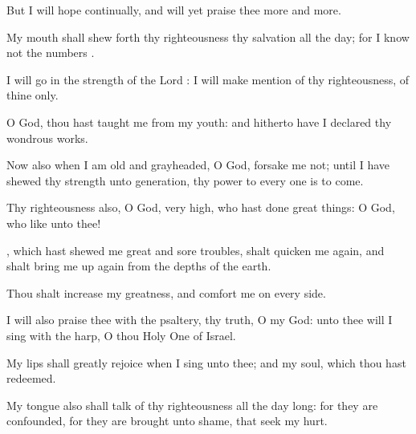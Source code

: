{\Q {}But I will
hope
continually, and will yet
praise thee
more and
more.


\par }{\Q {}My
mouth shall shew
forth thy
righteousness
{} thy
salvation all the
day; for I
know not the
numbers
{}.


\par }{\Q {}I will go
in the
strength of the
Lord
{}: I will make
mention of thy
righteousness,
{} of thine only.


\par }{\Q {}O
God, thou hast
taught me from my
youth: and hitherto have I
declared thy wondrous
works.


\par }{\Q {}Now also
when I am
old and
grayheaded, O
God,
forsake me not; until I have
shewed thy
strength unto
{}
generation,
{} thy
power to every one
{} is to
come.


\par }{\Q {}Thy
righteousness also, O
God,
{} very
high, who hast
done great
things: O
God, who
{} like unto thee!


\par }{\Q {}, which hast
shewed me
great and
sore
troubles, shalt
quicken me
again, and shalt bring me
up
again from the
depths of the
earth.


\par }{\Q {}Thou shalt
increase my
greatness, and
comfort me on every
side.


\par }{\Q {}I will also
praise thee with the
psaltery,
{} thy
truth, O my
God: unto thee will I
sing with the
harp, O thou Holy
One of
Israel.


\par }{\Q {}My
lips shall greatly
rejoice when I
sing unto thee; and my
soul, which thou hast
redeemed.


\par }{\Q {}My
tongue also shall
talk of thy
righteousness all the
day long: for they are
confounded, for they are brought unto
shame, that
seek my
hurt.




\par }
